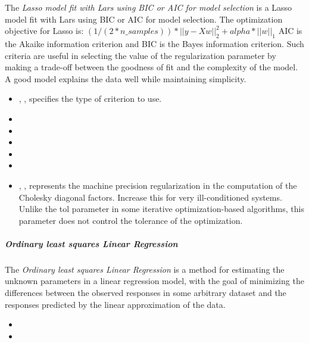 The \textit{Lasso model fit with Lars using BIC or AIC for model selection} is
a Lasso model fit with Lars using BIC or AIC for model selection.
The optimization objective for Lasso is:
$(1 / (2 * n\_samples)) * ||y - Xw||^2_2 + alpha * ||w||_1$
AIC is the Akaike information criterion and BIC is the Bayes information
criterion.
%
Such criteria are useful in selecting the value of the regularization parameter
by making a trade-off between the goodness of fit and the complexity of the
model.
%
A good model explains the data well while maintaining simplicity.
%
\begin{itemize}
  \item {}, , specifies the type of
  criterion to use.
  \item {}
  \item \verDescriptionB{}
  \item {}
  \item \precomputeDescription{}
  \item \maxIterDescription{}
  \item {}, , represents the machine
  precision regularization in the computation of the Cholesky diagonal factors.
  Increase this for very ill-conditioned systems.
  Unlike the tol parameter in some iterative optimization-based algorithms, this
  parameter does not control the tolerance of the optimization.
\end{itemize}

\subparagraph{Ordinary least squares Linear Regression}
\mbox{}

The \textit{Ordinary least squares Linear Regression} is a method for
estimating the unknown parameters in a linear regression model, with the goal of
minimizing the differences between the observed responses in some arbitrary
dataset and the responses predicted by the linear approximation of the data.
%

\begin{itemize}
  \item {}
  \item {}
\end{itemize}

